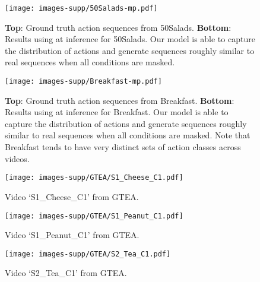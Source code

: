 \documentclass[10pt,twocolumn,letterpaper]{article}
\begin{document}
\begin{figure}[t]
\vspace{-2.5cm}
\begin{center}
   \texttt{[image: images-supp/50Salads-mp.pdf]}
\end{center}
   \caption{\textbf{Top}: Ground truth action sequences from 50Salads. \textbf{Bottom}: Results using  at inference for 50Salads. Our model is able to capture the distribution of actions and generate sequences roughly similar to real sequences when all conditions are masked.}
\label{fig:50Salads-mp}
\end{figure}

\begin{figure}[h]
\vspace{-2.5cm}
\begin{center}
   \texttt{[image: images-supp/Breakfast-mp.pdf]}
\end{center}
   \caption{\textbf{Top}: Ground truth action sequences from Breakfast. \textbf{Bottom}: Results using  at inference for Breakfast. Our model is able to capture the distribution of actions and generate sequences roughly similar to real sequences when all conditions are masked. Note that Breakfast tends to have very distinct sets of action classes across videos.}
\label{fig:Breakfast-mp}
\end{figure}

\begin{figure}[h]
\vspace{-0.3cm}
\begin{center}
   \texttt{[image: images-supp/GTEA/S1\_Cheese\_C1.pdf]}
\end{center}
   \caption{Video `S1\_Cheese\_C1' from GTEA.}
\label{fig:GTEA-1}
\end{figure}

\begin{figure}[h]
\vspace{-0.3cm}
\begin{center}
   \texttt{[image: images-supp/GTEA/S1\_Peanut\_C1.pdf]}
\end{center}
   \caption{Video `S1\_Peanut\_C1' from GTEA.}
\label{fig:GTEA-2}
\end{figure}

\begin{figure}[h]
\vspace{-0.3cm}
\begin{center}
   \texttt{[image: images-supp/GTEA/S2\_Tea\_C1.pdf]}
\end{center}
   \caption{Video `S2\_Tea\_C1' from GTEA.}
\label{fig:GTEA-3}
\end{figure}
\end{document}
